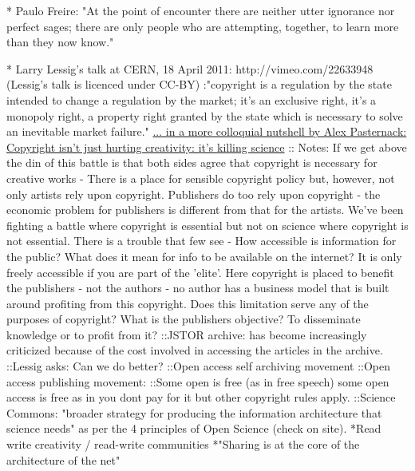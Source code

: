\documentclass[final,authoryear,3p]{elsarticle-open-drafting}
\begin{document}
* Paulo Freire: "At the point of encounter there are neither utter ignorance nor perfect sages; there are only people who are attempting, together, to learn more than they now know." 

* Larry Lessig's talk at CERN, 18 April 2011: http://vimeo.com/22633948 (Lessig's talk is licenced under CC-BY) 
:"copyright is a regulation by the state intended to change a regulation by the market; it's an exclusive right, it's a monopoly right, a property right granted by the state which is necessary to solve an inevitable market failure." \href{http://motherboard.tv/2011/4/25/lessig-copyright-isn-t-just-hurting-creativity-it-s-killing-science-video--2}{ ... in a more colloquial nutshell by Alex Pasternack: Copyright isn't just hurting creativity: it's killing science} 
:: Notes: If we get above the din of this battle is that both sides agree that copyright is necessary for creative works - There is a place for sensible copyright policy but, however, not only artists rely upon copyright. Publishers do too rely upon copyright - the economic problem for publishers is different from that for the artists. We've been fighting a battle where copyright is essential but not on science where copyright is not essential. There is a trouble that few see - How accessible is information for the public? What does it mean for info to be available on the internet? It is only freely accessible if you are part of the 'elite'. Here copyright is placed to benefit the publishers - not the authors - no author has a business model that is built around profiting from this copyright. Does this limitation serve any of the purposes of copyright? What is the publishers objective? To disseminate knowledge or to profit from it? 
::JSTOR archive: has become increasingly criticized because of the cost involved in accessing the articles in the archive. 
::Lessig asks: Can we do better? 
::Open access self archiving movement
::Open access publishing movement:
::Some open is free (as in free speech) some open access is free as in you dont pay for it but other copyright rules apply.
::Science Commons: "broader strategy for producing the information architecture that science needs" as per the 4 principles of Open Science (check on site).
*Read write creativity / read-write communities
*"Sharing is at the core of the architecture of the net"
\end{document}
